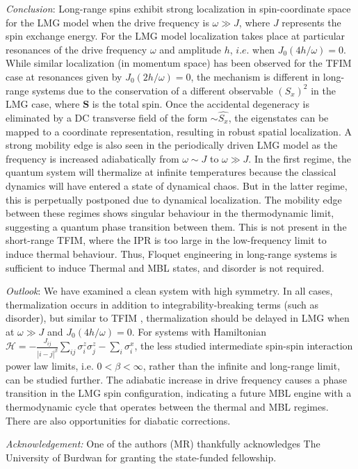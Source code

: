 \documentclass[%
 reprint,
 amsmath,amssymb,
 aps,
]{revtex4-2}
\begin{document}
 \emph{Conclusion}: Long-range spins exhibit strong localization in spin-coordinate space for the LMG model when the drive frequency is $\omega \gg J$, where $J$ represents the spin exchange energy. For the LMG model localization takes place at particular resonances of the drive frequency $\omega$ and amplitude $h$, $\textit{i.e.}$ when $J_0(4h/\omega)=0$. While similar localization (in momentum space) has been observed for the TFIM case at resonances given by $J_0(2h/\omega)=0$, the mechanism is different in long-range systems due to the conservation of a different observable $(S_x)^2$ in the LMG case, where $\mathbf{S}$ is the total spin. Once the accidental degeneracy is eliminated by a DC transverse field of the form $\sim \hat{S_x}$, the eigenstates can be mapped to a coordinate representation, resulting in robust spatial localization. A strong mobility edge is also seen in the periodically driven LMG model as the frequency is increased adiabatically from $\omega \sim J$ to $\omega \gg J$.
 In the first regime, the quantum system will thermalize at infinite temperatures because the classical dynamics will have entered a state of dynamical chaos.
 But in the latter regime, this is perpetually postponed due to dynamical localization. The mobility edge between these regimes shows singular behaviour in the thermodynamic limit, suggesting a quantum phase transition between them. This is not present in the short-range TFIM, where the IPR is too large in the low-frequency limit to induce thermal behaviour. Thus, Floquet engineering in long-range systems is sufficient to induce Thermal and MBL states, and disorder is not required.
 
 \emph{Outlook}: 
We have examined a clean system with high symmetry. In all cases, thermalization occurs in addition to integrability-breaking terms (such as disorder), but similar to TFIM \cite{haugland_changing_2021}, thermalization should be delayed in LMG when at $\omega\gg J$ and $J_0(4h/\omega) = 0$. For systems with Hamiltonian $\mathcal{H} = -\frac{J_{ij}}{|i-j|^\beta} \sum_{ij}\sigma^z_i\sigma^z_j -\sum_i \sigma^x_i$, the less studied intermediate spin-spin interaction power law limits, i.e. $0<\beta<\infty$, rather than the infinite and long-range limit, can be studied further. The adiabatic increase in drive frequency causes a phase transition in the LMG spin configuration, indicating a future MBL engine with a thermodynamic cycle that operates between the thermal and MBL regimes. There are also opportunities for diabatic corrections. 

 
 
{\it Acknowledgement:}
 One of the authors (MR) thankfully acknowledges The University of Burdwan for granting the state-funded fellowship.



\nocite{*}

\end{document}
